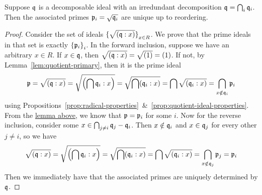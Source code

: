 \begin{theorem}\label{thm:primary-uniqueness-1}
    Suppose \(\mathfrak{q}\) is a decomposable ideal with an irredundant decomposition \(\mathfrak{q} = \bigcap_i \mathfrak{q}_i\).
    Then the associated primes \(\mathfrak{p}_i = \sqrt{\mathfrak{q}_i}\) are unique up to reordering.
\end{theorem}
\begin{proof}
    Consider the set of ideals \({\{\sqrt{(\mathfrak{q}:x)}\}}_{x \in R}\).
    We prove that the prime ideals in that set is exactly \({\{\mathfrak{p}_i\}}_i\).
    In the forward inclusion, suppose we have an arbitrary \(x \in R\).
    If \(x \in \mathfrak{q}\), then \(\sqrt{(\mathfrak{q}:x)} = \sqrt{(1)} = (1)\).
    If not, by Lemma~\ref{lem:quotient-primary}, then it is the prime ideal
    \begin{equation*}
        \mfk{p} = \sqrt{(\mfk{q}:x)} = \sqrt{\pqty{\bigcap \mfk{q}_i:x}} = \sqrt{\bigcap (\mfk{q}_i:x)}
        = \bigcap\sqrt{(\mfk{q}_i:x)} = \bigcap_{x \notin \mfk{q}_i} \mfk{p}_i
    \end{equation*}
    using Propositions~\ref{prop:radical-properties}~\&~\ref{prop:quotient-ideal-properties}.
    From the \hyperref[lem:prime-intersection]{lemma above},
    we know that \(\mathfrak{p} = \mathfrak{p}_i\) for some \(i\).
    Now for the reverse inclusion, consider some \(x \in \bigcap_{j \neq i} \mathfrak{q}_j - \mathfrak{q}_i\).
    Then \(x \notin \mathfrak{q}_i\) and \(x \in \mathfrak{q}_j\) for every other \(j \neq i\),
    so we have
    \begin{equation*}
        \sqrt{(\mfk{q}:x)} = \sqrt{\pqty{\bigcap \mfk{q}_i:x}} = \sqrt{\bigcap (\mfk{q}_i:x)}
        = \bigcap\sqrt{(\mfk{q}_i:x)} = \bigcap_{x \notin \mfk{q}_j} \mfk{p}_j = \mfk{p}_i
    \end{equation*}
    Then we immediately have that the associated primes are uniquely determined by \(\mathfrak{q}\).
\end{proof}

